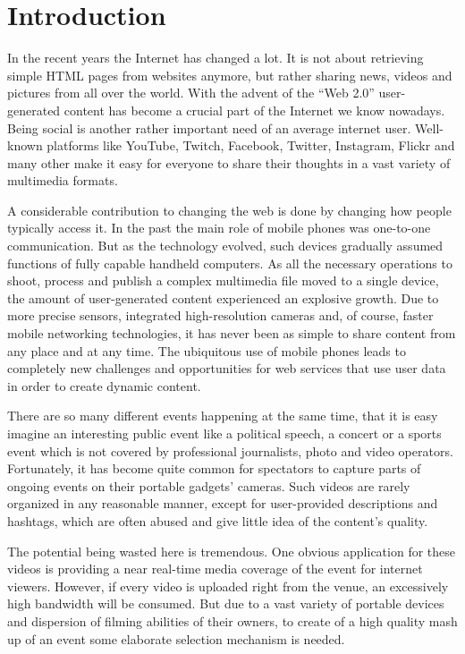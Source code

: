\documentclass[conference]{IEEEtran}
\begin{document}
\section{Introduction}

In the recent years the Internet has changed a lot. 
It is not about retrieving simple HTML pages from websites anymore, 
but rather sharing news, videos and pictures from all over the world.
With the advent of the ``Web 2.0'' user-generated content has become a crucial part of the Internet we know nowadays.
Being social is another rather important need of an average internet user.
Well-known platforms like YouTube, Twitch, Facebook, Twitter, Instagram, Flickr and many other
make it easy for everyone to share their thoughts in a vast variety of multimedia formats.

A considerable contribution to changing the web is done by changing how people typically access it.
In the past the main role of mobile phones was one-to-one communication. 
But as the technology evolved, such devices gradually assumed functions of fully capable handheld computers.
As all the necessary operations to shoot, process and publish a complex multimedia file moved to a single device, 
the amount of user-generated content experienced an explosive growth.
Due to more precise sensors, integrated high-resolution cameras and, of course, faster mobile networking technologies, 
it has never been as simple to share content from any place and at any time.
The ubiquitous use of mobile phones leads to completely new challenges and opportunities for web services 
that use user data in order to create dynamic content.

There are so many different events happening at the same time, 
that it is easy imagine an interesting public event like a political speech, 
a concert or a sports event which is not covered by professional journalists, photo and video operators.
Fortunately, it has become quite common for spectators to capture parts of ongoing events on their portable gadgets' cameras.
Such videos are rarely organized in any reasonable manner, except for user-provided descriptions and hashtags, 
which are often abused and give little idea of the content's quality.

The potential being wasted here is tremendous. 
One obvious application for these videos is providing a near real-time media coverage of the event for internet viewers.
However, if every video is uploaded right from the venue, an excessively high bandwidth will be consumed.
But due to a vast variety of portable devices and dispersion of filming abilities of their owners,
to create of a high quality mash up of an event some elaborate selection mechanism is needed.
\end{document}
